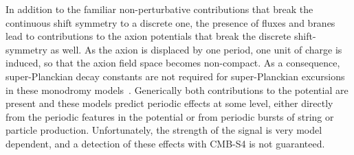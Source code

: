 

In addition to the familiar non-perturbative contributions that break the continuous shift symmetry to a discrete one, the presence of fluxes and branes lead to contributions to the axion potentials that break the discrete shift-symmetry as well. As the axion is displaced by one period, one unit of charge is induced, so that the axion field space becomes non-compact. As a consequence, super-Planckian decay constants are not required for super-Planckian excursions in these monodromy models~\cite{Silverstein:2008sg, McAllister:2008hb, Kaloper:2008fb, Berg:2009tg, Palti:2014kza,McAllister:2014mpa, Marchesano:2014mla, Blumenhagen:2015xpa,Hebecker:2015tzo}. Generically both contributions to the potential are present and these models predict periodic effects at some level, either directly from the periodic features in the potential or from periodic bursts of string or particle production. Unfortunately, the strength of the signal is very model dependent, and a detection of these effects with CMB-S4 is not guaranteed.


